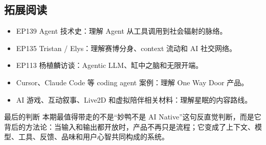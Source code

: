 \documentclass[a4paper]{article}
\begin{document}
\subsection{拓展阅读}

\begin{itemize}
\item EP139 Agent 技术史：理解 Agent 从工具调用到社会辐射的脉络。
\item EP135 Tristan / Elys：理解赛博分身、context 流动和 AI 社交网络。
\item EP113 杨植麟访谈：Agentic LLM、缸中之脑和无限开端。
\item Cursor、Claude Code 等 coding agent 案例：理解 One Way Door 产品。
\item AI 游戏、互动叙事、Live2D 和虚拟陪伴相关材料：理解星眠的内容路线。
\end{itemize}

\begin{importantbox}{最后的判断}
本期最值得带走的不是“妙鸭不是 AI Native”这句反直觉判断，而是它背后的方法论：当输入和输出都开放时，产品不再只是流程；它变成了上下文、模型、工具、反馈、品味和用户心智共同构成的系统。
\end{importantbox}
\end{document}
